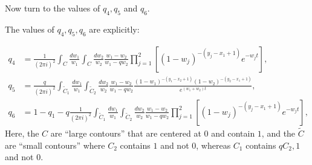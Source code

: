 \documentclass{ximera}
\begin{document}
Now turn to the values of $q_4,q_5$ and $q_6$.
\begin{lemma}
The values of $q_4,q_5,q_6$ are explicitly:


\begin{align*}
q_4&=\frac{ 1}{(2\pi i)^2}\int_{C} \frac{d w_{1}}{w_{1}}  \int_{C} \frac{d w_{2}}{w_{2}} \frac{w_1-w_2}{w_1-qw_2} \prod_{j=1}^{2}\left[(1-w_j)^{-({y_j-x_1}+1)}e^{-w_{j} t}\right] ,\\
q_5&= \frac{ q}{(2\pi i)^2}\int_{\tilde{C}_{1}}  \frac{dw_1}{w_1}  \int_{\tilde{C}_{2}}  \frac{dw_2}{w_2} \frac{w_1-w_2}{w_1-qw_2} \frac{(1-w_1)^{-({y_1-x_2}+1)}(1-w_2)^{-({y_2-x_1}+1)}}{e^{(w_1+w_2)t }} ,\\
q_6 &= 1- q_1 - q\frac{ 1}{(2\pi i)^2}\int_{\tilde{C}_{1}}  \frac{dw_1}{w_1}  \int_{\tilde{C}_{2}}  \frac{dw_2}{w_2} \frac{w_1-w_2}{w_1-qw_2}\prod_{j=1}^2\left[ (1-w_j)^{-({y_j-x_1}+1)} e^{-w_jt  } \right],
\end{align*}
Here, the $C$ are ``large contours'' that are centered at $0$ and contain $1$, and the $\tilde{C}$ are ``small contours'' where $C_2$ contains $1$ and not $0$, whereas $C_1$ contains $qC_2,1$ and not $0$.
\end{lemma}
\end{document}
